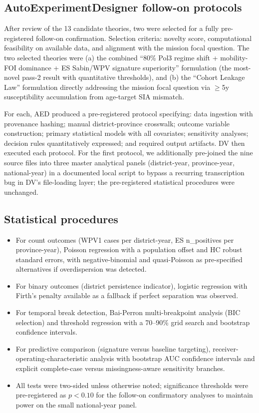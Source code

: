 \documentclass[11pt]{article}
\begin{document}
\subsection{AutoExperimentDesigner follow-on protocols}

After review of the 13 candidate theories, two were selected for a fully pre-registered follow-on confirmation. Selection criteria: novelty score, computational feasibility on available data, and alignment with the mission focal question. The two selected theories were (a) the combined ``80\% Pol3 regime shift + mobility-FOI dominance + ES Sabin/WPV signature superiority'' formulation (the most-novel pass-2 result with quantitative thresholds), and (b) the ``Cohort Leakage Law'' formulation directly addressing the mission focal question via $\geq$5y susceptibility accumulation from age-target SIA mismatch.

For each, AED produced a pre-registered protocol specifying: data ingestion with provenance hashing; manual district-province crosswalk; outcome variable construction; primary statistical models with all covariates; sensitivity analyses; decision rules quantitatively expressed; and required output artifacts. DV then executed each protocol. For the first protocol, we additionally pre-joined the nine source files into three master analytical panels (district-year, province-year, national-year) in a documented local script to bypass a recurring transcription bug in DV's file-loading layer; the pre-registered statistical procedures were unchanged.

\subsection{Statistical procedures}

\begin{itemize}[noitemsep]
\item For count outcomes (WPV1 cases per district-year, ES n\_positives per province-year), Poisson regression with a population offset and HC robust standard errors, with negative-binomial and quasi-Poisson as pre-specified alternatives if overdispersion was detected.
\item For binary outcomes (district persistence indicator), logistic regression with Firth's penalty available as a fallback if perfect separation was observed.
\item For temporal break detection, Bai-Perron multi-breakpoint analysis (BIC selection) and threshold regression with a 70--90\% grid search and bootstrap confidence intervals.
\item For predictive comparison (signature versus baseline targeting), receiver-operating-characteristic analysis with bootstrap AUC confidence intervals and explicit complete-case versus missingness-aware sensitivity branches.
\item All tests were two-sided unless otherwise noted; significance thresholds were pre-registered as $p<0.10$ for the follow-on confirmatory analyses to maintain power on the small national-year panel.
\end{itemize}
\end{document}
